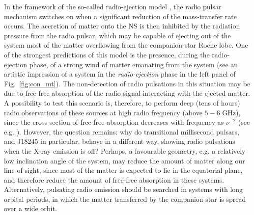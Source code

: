 \documentclass[graybox]{svmult}
\begin{document}
In the framework of the so-called radio-ejection model \cite{Burderi2001}, the radio pulsar mechanism switches on when a significant reduction of the mass-transfer rate occurs. The accretion of matter onto the NS is then inhibited by the radiation pressure from the radio pulsar, which may be capable of ejecting out of the system most of the matter overflowing from the companion-star Roche lobe. One of the strongest predictions of this model is the presence, during the radio-ejection phase, of a strong wind of matter emanating from the system (see an artistic impression of a system in the \textit{radio-ejection} phase in the left panel of Fig.~\ref{fig:con_mt}). The non-detection of radio pulsations in this situation may be due to free-free absorption of the radio signal interacting with the ejected matter. A possibility to test this scenario is, therefore, to perform deep (tens of hours) radio observations of these sources at high radio frequency (above $5-6$ GHz), since the cross-section of free-free absorption decreases with frequency as $\nu^{-2}$ (see e.g. \cite{Iacolina2009,Iacolina2010}). However, the question remains: why do transitional millisecond pulsars, and J18245 in particular, behave in a different way, showing radio pulsations when the X-ray emission is off? Perhaps, a favourable geometry, e.g. a relatively low inclination angle of the system, may reduce the amount of matter along our line of sight, since most of the matter is expected to lie in the equatorial plane, and therefore reduce the amount of free-free absorption in these systems. Alternatively, pulsating radio emission should be searched in systems with long orbital periods, in which the matter transferred by the companion star is spread over a wide orbit. 
\end{document}
